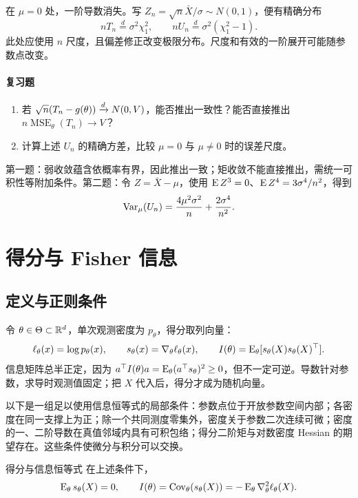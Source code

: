 在 $\mu=0$ 处，一阶导数消失。写 $Z_n=\sqrt n\bar X/\sigma\sim N(0,1)$，便有精确分布
\[
 nT_n\overset d=\sigma^2\chi_1^2,
 \qquad nU_n\overset d=\sigma^2(\chi_1^2-1).
\]
此处应使用 $n$ 尺度，且偏差修正改变极限分布。尺度和有效的一阶展开可能随参数点改变。

\paragraph{复习题}
\begin{enumerate}
 \item 若 $\sqrt n(T_n-g(\theta))\xrightarrow{d} N(0,V)$，能否推出一致性？能否直接推出 $n\operatorname{MSE}_\theta(T_n)\to V$？
 \item 计算上述 $U_n$ 的精确方差，比较 $\mu=0$ 与 $\mu\ne0$ 时的误差尺度。
\end{enumerate}
\begin{notebox}[答案线索]
第一题：弱收敛蕴含依概率有界，因此推出一致；矩收敛不能直接推出，需统一可积性等附加条件。第二题：令 $Z=\bar X-\mu$，使用 $\operatorname{E} Z^3=0$、$\operatorname{E} Z^4=3\sigma^4/n^2$，得到
\[
 \operatorname{Var}_\mu(U_n)=\frac{4\mu^2\sigma^2}{n}+\frac{2\sigma^4}{n^2}.
\]
\end{notebox}

\section{得分与 Fisher 信息}

\subsection{定义与正则条件}
令 $\theta\in\Theta\subset\mathbb R^d$，单次观测密度为 $p_\theta$，得分取列向量：
\[
 \ell_\theta(x)=\log p_\theta(x),\qquad
 s_\theta(x)=\nabla_\theta\ell_\theta(x),\qquad
 I(\theta)=\operatorname{E}_\theta[s_\theta(X)s_\theta(X)^\top].
\]
信息矩阵总半正定，因为 $a^\top I(\theta)a=\operatorname{E}_\theta(a^\top s_\theta)^2\ge0$，但不一定可逆。导数针对参数，求导时观测值固定；把 $X$ 代入后，得分才成为随机向量。

以下是一组足以使用信息恒等式的局部条件：参数点位于开放参数空间内部；各密度在同一支撑上为正；除一个共同测度零集外，密度关于参数二次连续可微；密度的一、二阶导数在真值邻域内具有可积包络；得分二阶矩与对数密度 Hessian 的期望存在。这些条件使微分与积分可以交换。

\begin{definitionbox}{得分与信息恒等式}
在上述条件下，
\[
 \operatorname{E}_\theta s_\theta(X)=0,\qquad
 I(\theta)=\operatorname{Cov}_\theta(s_\theta(X))
 =-\operatorname{E}_\theta\nabla_\theta^2\ell_\theta(X).
\]
\end{definitionbox}

